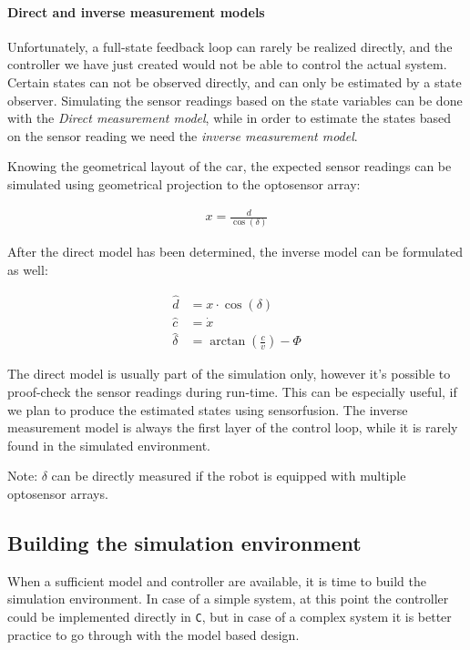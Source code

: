 \paragraph{Direct and inverse measurement models}

Unfortunately, a full-state feedback loop can rarely be realized directly, and the controller we have just created would not be able to control the actual system. Certain states can not be observed directly, and can only be estimated by a state observer. Simulating the sensor readings based on the state variables can be done with the \emph{Direct measurement model}, while in order to estimate the states based on the sensor reading we need the \emph{inverse measurement model}.

Knowing the geometrical layout of the car, the expected sensor readings can be simulated using geometrical projection to the optosensor array:

\begin{align}
    x = \frac{d}{\cos(\delta)}
\end{align}

After the direct model has been determined, the inverse model can be formulated as well:

\begin{align}
    \hat{d} &= x \cdot \cos(\delta) \\
    \hat{c} &=\dot{x} \\
    \hat{\delta} &= \arctan \left(\frac{c}{v}\right) - \Phi
\end{align}

The direct model is usually part of the simulation only, however it's possible to proof-check the sensor readings during run-time. This can be especially useful, if we plan to produce the estimated states using sensorfusion. The inverse measurement model is always the first layer of the control loop, while it is rarely found in the simulated environment.

Note: $\delta$ can be directly measured if the robot is equipped with multiple optosensor arrays.

\subsection{Building the simulation environment}

When a sufficient model and controller are available, it is time to build the simulation environment. In case of a simple system, at this point the controller could be implemented directly in \verb!C!, but in case of a complex system it is better practice to go through with the model based design.




